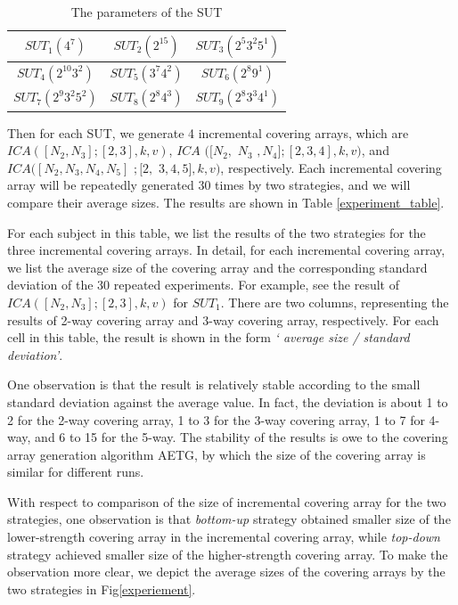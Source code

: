 \documentclass[conference]{IEEEtran}
\theoremstyle{definition}
\begin{document}
\begin{table}
\caption{The parameters of the SUT}
\label{ica_to_constuct}
\center
\begin{tabular}{c | c | c }
\hline  $SUT_{1}(4^{7}) $& $SUT_{2}(2^{15})$ & $SUT_{3}(2^{5}3^{2}5^{1})$ \\
\hline  $SUT_{4}(2^{10}3^{2})$ & $SUT_{5}(3^{7}4^{2})$ & $SUT_{6}(2^{8}9^{1})$ \\
\hline $SUT_{7}(2^{9}3^{2}5^{2})$ & $SUT_{8}(2^{8}4^{3})$ & $SUT_{9}(2^{8}3^{3}4^{1})$ \\
\hline
\end{tabular}
  \end{table}

Then for each SUT, we generate 4 incremental covering arrays, which are $ICA([N_{2},N_{3}]; [2, 3], k ,v)$, $ICA$ $([N_{2},$ $N_{3}$ $,N_{4}];[2, 3,4], k ,v)$, and $ICA([N_{2},N_{3},N_{4},N_{5}]$ $;[2,$ $ 3,4,5], k ,v)$, respectively. Each incremental covering array will be repeatedly generated 30 times by two strategies, and we will compare their average sizes. The results are shown in Table \ref{experiment_table}.

For each subject in this table, we list the results of the two strategies for the three incremental covering arrays. In detail, for each incremental covering array, we list the average size of the covering array and the corresponding standard deviation of the 30 repeated experiments. For example, see the result of $ICA([N_{2},N_{3}];[2,3],k,v)$ for $SUT_{1}$. There are two columns, representing the results of 2-way covering array and 3-way covering array, respectively. For each cell in this table, the result is shown in the form \emph{` average size / standard deviation'}.


One observation is that the result is relatively stable according to the small standard deviation against the average value. In fact, the deviation is about 1 to 2 for the 2-way covering array, 1 to 3 for the 3-way covering array, 1 to 7 for 4-way, and 6 to 15 for the 5-way. The stability of the results is owe to the covering array generation algorithm AETG, by which the size of the covering array is similar for different runs.

With respect to comparison of the size of incremental covering array for the two strategies, one observation is that \emph{bottom-up} strategy obtained smaller size of the lower-strength covering array in the incremental covering array, while \emph{top-down} strategy achieved smaller size of the higher-strength covering array.  To make the observation more clear, we depict the  average sizes of the covering arrays by the two strategies in Fig\ref{experiement}.
\end{document}
